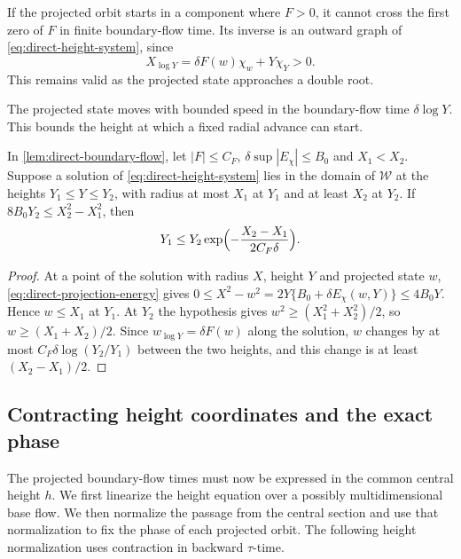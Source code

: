 \begin{remark}
\label{rem:direct-projected-continuation}
If the projected orbit starts in a component where \(F>0\), it
cannot cross the first zero of \(F\) in finite boundary-flow time.
Its inverse is an outward graph of \eqref{eq:direct-height-system}, since
\begin{equation}
\label{eq:direct-inverse-flux}
 X_{\log Y}=\delta F(w)\chi_w+Y\chi_Y>0.
\end{equation}
This remains valid as the projected state approaches a double root.
\end{remark}

The projected state moves with bounded speed in the boundary-flow time
\(\delta\log Y\). This bounds the height at which a fixed radial advance
can start.

\begin{lemma}
\label{lem:direct-radial-advance}
In \cref{lem:direct-boundary-flow}, let \(|F|\le C_F\),
\(\delta\sup|E_\chi|\le B_0\) and \(X_1<X_2\). Suppose a solution of
\eqref{eq:direct-height-system} lies in the domain of \(\mathcal W\) at
the heights \(Y_1\le Y\le Y_2\), with radius at most \(X_1\) at \(Y_1\)
and at least \(X_2\) at \(Y_2\). If \(8B_0Y_2\le X_2^2-X_1^2\), then
\[
 Y_1\le Y_2\exp\Bigl(-\frac{X_2-X_1}{2C_F\delta}\Bigr).
\]
\end{lemma}

\begin{proof}
At a point of the solution with radius \(X\), height \(Y\) and projected
state \(w\), \eqref{eq:direct-projection-energy} gives
\(0\le X^2-w^2=2Y\{B_0+\delta E_\chi(w,Y)\}\le4B_0Y\).
Hence \(w\le X_1\) at \(Y_1\). At \(Y_2\) the hypothesis gives
\(w^2\ge(X_1^2+X_2^2)/2\), so \(w\ge(X_1+X_2)/2\). Since
\(w_{\log Y}=\delta F(w)\) along the solution, \(w\) changes by at most
\(C_F\delta\log(Y_2/Y_1)\) between the two heights, and this change is at
least \((X_2-X_1)/2\).
\end{proof}

\subsection{Contracting height coordinates and the exact phase}

The projected boundary-flow times must now be expressed in the common
central height \(h\). We first linearize the height equation over a
possibly multidimensional base flow. We then normalize the passage from
the central section and use that normalization to fix the phase of each
projected orbit.
The following height normalization uses contraction in backward
\(\tau\)-time.


